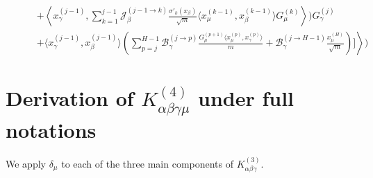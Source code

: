 \documentclass[11pt,a4paper]{article}
\theoremstyle{definition}
\begin{document}
\begin{align}
    & \qquad \left. + \left\langle x^{(j-1)}_\gamma, \sum_{k=1}^{j-1} \mathcal{J}^{(j-1 \to k)}_{\beta} \frac{\sigma'_{k}(x_\beta)}{\sqrt{m}} \langle x^{(k-1)}_\mu, x^{(k-1)}_\beta \rangle G^{(k)}_\mu \right\rangle \Biggr) G^{(j)}_\gamma \right. \nonumber \\
    & \qquad \left. + \langle x^{(j-1)}_\gamma, x^{(j-1)}_\beta \rangle \left( \sum_{p=j}^{H-1} \mathcal{B}^{(j \to p)}_{\gamma} \frac{G^{(p+1)}_\mu \langle x^{(p)}_\mu, x^{(p)}_\gamma \rangle}{m} + \mathcal{B}^{(j \to H-1)}_{\gamma} \frac{x^{(H)}_\mu}{\sqrt{m}} \right) \Biggr] \right\rangle \Biggr)
\end{align}





















\newpage
\section{Derivation of $K^{(4)}_{\alpha\beta\gamma\mu}$ under full notations}
We apply $\delta_\mu$ to each of the three main components of $K^{(3)}_{\alpha\beta\gamma}$.
\end{document}
